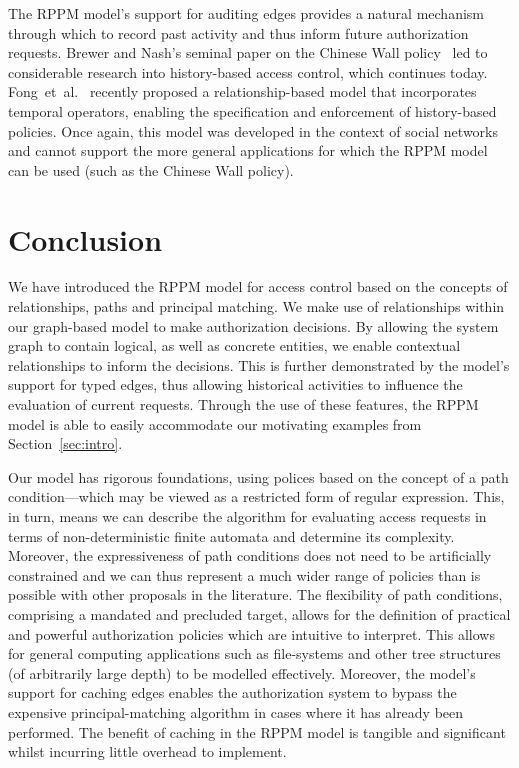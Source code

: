 \documentclass{article}
\begin{document}
The RPPM model's support for auditing edges provides a natural mechanism through which to record past activity and thus inform future authorization requests.
Brewer and Nash's seminal paper on the Chinese Wall policy~\cite{BrewerN89} led to considerable research into history-based access control, which continues today.
Fong~et~al.~\cite{FoMeKr13} recently proposed a relationship-based model that incorporates temporal operators, enabling the specification and enforcement of history-based policies.
Once again, this model was developed in the context of social networks and cannot support the more general applications for which the RPPM model can be used (such as the Chinese Wall policy).

\section{Conclusion}\label{sec:conclusion}
We have introduced the RPPM model for access control based on the concepts of relationships, paths and principal matching.
We make use of relationships within our graph-based model to make authorization decisions.
By allowing the system graph to contain logical, as well as concrete entities, we enable contextual relationships to inform the decisions.
This is further demonstrated by the model's support for typed edges, thus allowing historical activities to influence the evaluation of current requests.
Through the use of these features, the RPPM model is able to easily accommodate our motivating examples from Section~\ref{sec:intro}.

Our model has rigorous foundations, using polices based on the concept of a path condition---which may be viewed as a restricted form of regular expression.
This, in turn, means we can describe the algorithm for evaluating access requests in terms of non-deterministic finite automata and determine its complexity.
Moreover, the expressiveness of path conditions does not need to be artificially constrained and we can thus represent a much wider range of policies than is possible with other proposals in the literature.
The flexibility of path conditions, comprising a mandated and precluded target, allows for the definition of practical and powerful authorization policies which are intuitive to interpret.
This allows for general computing applications such as file-systems and other tree structures (of arbitrarily large depth) to be modelled effectively.
Moreover, the model's support for caching edges enables the authorization system to bypass the expensive principal-matching algorithm in cases where it has already been performed.
The benefit of caching in the RPPM model is tangible and significant whilst incurring little overhead to implement.
\end{document}
